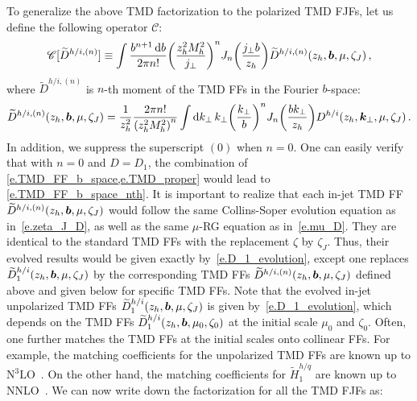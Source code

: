\documentclass[a4paper, 11 pt]{article}
\begin{document}
To generalize the above TMD factorization to the polarized TMD FJFs, let us define the following operator $\mathscr{C}$:
\begin{align}
\label{e.TMD_factorization_operator}
\mathscr{C} [\widetilde{D}^{h/i, (n)}]
\equiv
\int \frac{b^{n+1} \dd{b}}{2 \pi n !} \pqty{\frac{z_h^2 M_h^2}{j_{\perp}}}^n J_n \pqty{\frac{j_{\perp} b}{z_h}} \widetilde{D}^{h/i, (n)} \pqty{z_h, \boldsymbol{b}, \mu, \zeta_J}
\, ,
\end{align}
where $\widetilde{D}^{h/i, (n)}$ is $n$-th moment of the TMD FFs in the Fourier $b$-space:
\begin{equation}
\widetilde{D}^{h/i, (n)} \pqty{z_h, \boldsymbol{b}, \mu, \zeta_J}
=
\frac{1}{z_h^2} \frac{2 \pi n !}{\pqty{z_h^2 M_h^2}^n}
\int \dd{k_{\perp}} k_{\perp} \pqty{\frac{k_{\perp}}{b}}^n J_n \pqty{\frac{b k_{\perp}}{z_h}} D^{h / i}\pqty{z_h, \boldsymbol{k}_{\perp}, \mu, \zeta_J}
\, . \label{e.TMD_FF_b_space_nth}
\end{equation}
In addition, we suppress the superscript $(0)$ when $n = 0$. 
One can easily verify that with $n = 0$ and $D = D_1$, the combination of \cref{e.TMD_FF_b_space,e.TMD_proper} would lead to \cref{e.TMD_FF_b_space_nth}.
It is important to realize that each in-jet TMD FF $\widetilde{D}^{h/i, (n)} \pqty{z_h, \boldsymbol{b}, \mu, \zeta_J}$ would follow the same Collins-Soper evolution equation as in~\cref{e.zeta_J_D}, as well as the same $\mu$-RG equation as in~\cref{e.mu_D}.
They are identical to the standard TMD FFs with the replacement $\zeta$ by $\zeta_J$. Thus, their evolved results would be given exactly by~\cref{e.D_1_evolution}, except one replaces $\widetilde{D}_1^{h/i} \pqty{z_h, \boldsymbol{b}, \mu, \zeta_J}$ by the corresponding TMD FFs $\widetilde{D}^{h/i, (n)} \pqty{z_h, \boldsymbol{b}, \mu, \zeta_J}$ defined above and given below for specific TMD FFs.
Note that the evolved in-jet unpolarized TMD FFs $\widetilde{D}_1^{h/i} \pqty{z_h, \boldsymbol{b}, \mu , \zeta_J}$ is given by~\cref{e.D_1_evolution}, which depends on the TMD FFs $\widetilde{D}_1^{h/i} \pqty{z_h, \boldsymbol{b}, \mu_0, \zeta_0}$ at the initial scale $\mu_0$ and $\zeta_0$.
Often, one further matches the TMD FFs at the initial scales onto collinear FFs.
For example, the matching coefficients for the unpolarized TMD FFs are known up to ${\mathrm{N}^3\mathrm{LO}}$~\cite{Luo:2020epw,Ebert:2020qef}.
On the other hand, the matching coefficients for $\widetilde{H}_1^{h/q}$ are known up to NNLO~\cite{Gutierrez-Reyes:2018iod}.
We can now write down the factorization for all the TMD FJFs as:
\end{document}
